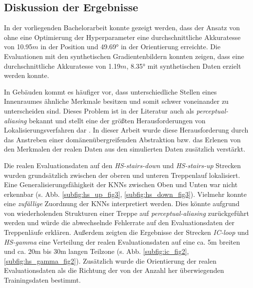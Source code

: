\subsection{Diskussion der Ergebnisse}



In der vorliegenden Bachelorarbeit konnte gezeigt werden, dass der Ansatz von \citet{acharyaBIMPoseNetIndoorCamera2019} ohne eine Optimierung der Hyperparameter eine durchschnittliche Akkuratesse von 10.95$m$ in der Position und 49.69° in der Orientierung erreichte. Die Evaluationen mit den synthetischen Gradientenbildern konnten zeigen, dass eine durchschnittliche Akkuratesse von 1.19$m$, 8.35° mit synthetischen Daten erzielt werden konnte.



In Gebäuden kommt es häufiger vor, dass unterschiedliche Stellen eines Innenraumes ähnliche Merkmale besitzen und somit schwer voneinander zu unterscheiden sind. Dieses Problem ist in der Literatur auch als \textit{perceptual-aliasing} bekannt und stellt eine der größten Herausforderungen von Lokalisierungsverfahren dar \cite{lowryVisualPlaceRecognition2016}. In dieser Arbeit wurde diese Herausforderung durch das Anstreben einer domänenübergreifenden Abstraktion bzw. das Erlenen von den Merkmalen der realen Daten aus den simulierten Daten zusätzlich verstärkt.


Die realen Evaluationsdaten auf den \textit{HS-stairs-down} und \textit{HS-stairs-up} Strecken wurden grundsätzlich zwischen der oberen und unteren Treppenlauf lokalisiert. Eine Generalisierungsfähigkeit der KNNs zwischen Oben und Unten war nicht erkennbar (s. Abb. \ref{subfig:hs_up_fig3}, \ref{subfig:hs_down_fig3}). Vielmehr konnte eine \textit{zufällige} Zuordnung der KNNs interpretiert werden. Dies könnte aufgrund von wiederholenden Strukturen einer Treppe auf \textit{perceptual-aliasing} zurückgeführt werden und würde die abwechselnde Fehlerrate auf den Evaluationsdaten der Treppenläufe erklären. Außerdem zeigten die Ergebnisse der Strecken \textit{IC-loop} und \textit{HS-gamma} eine Verteilung der realen Evaluationsdaten auf eine ca. 5m breiten und ca. 20m bis 30m langen Teilzone (s. Abb. \ref{subfig:ic_fig2}, \ref{subfig:hs_gamma_fig2}). Zusätzlich wurde die Orientierung der realen Evaluationsdaten als die Richtung der von der Anzahl her überwiegenden Trainingsdaten bestimmt.


